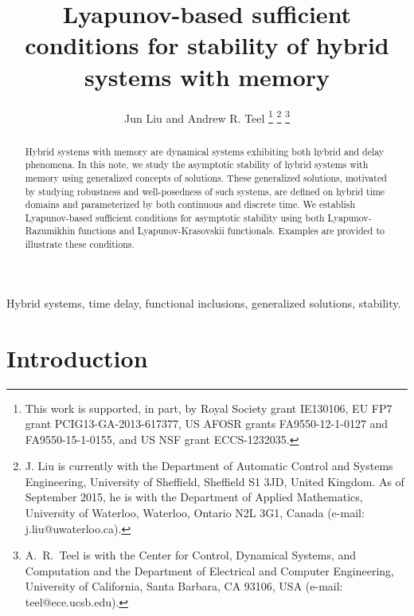 \documentclass[journal,final,twocolumn]{IEEEtran}
\theoremstyle{definition}
\begin{document}
\title{\Large\bfseries Lyapunov-based sufficient conditions for stability of hybrid systems with memory}

\author{Jun Liu and Andrew R. Teel
\thanks{This work is supported, in part, by Royal Society grant IE130106, EU FP7 grant PCIG13-GA-2013-617377, US AFOSR grants FA9550-12-1-0127 and FA9550-15-1-0155, and US NSF grant ECCS-1232035.}
\thanks{J. Liu is currently with the Department of Automatic Control and Systems Engineering, University of Sheffield, Sheffield S1 3JD, United Kingdom. As of September 2015, he is with the Department of Applied Mathematics, University of Waterloo, Waterloo, Ontario N2L 3G1, Canada (e-mail: j.liu@uwaterloo.ca).}
\thanks{A.~R.~Teel is with the Center for Control, Dynamical Systems, and Computation and the Department of Electrical and Computer Engineering, University of California, Santa Barbara, CA 93106, USA (e-mail: teel@ece.ucsb.edu).}}

\maketitle

\begin{abstract}

Hybrid systems with memory are dynamical systems exhibiting both hybrid and delay phenomena.
In this note, we study the asymptotic stability of hybrid systems with memory using generalized concepts of solutions. These generalized solutions, motivated by studying robustness and well-posedness of such systems, are defined on hybrid time domains and parameterized by both continuous and discrete time. We establish Lyapunov-based sufficient conditions for asymptotic stability using both Lyapunov-Razumikhin functions and Lyapunov-Krasovskii functionals. Examples are provided to illustrate these conditions.

\end{abstract}

\begin{IEEEkeywords}

Hybrid systems, time delay, functional inclusions, generalized solutions, stability.

\end{IEEEkeywords}

\IEEEpeerreviewmaketitle

\section{Introduction}
\end{document}

